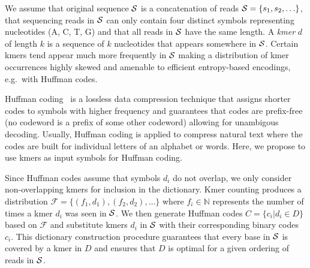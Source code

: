 \documentclass[12pt]{cmuthesis}
\makeatletter
\newcommand{\eg}{e.g.\@}
\makeatother
\begin{document}
We assume that original sequence $\mathcal{S}$ is a concatenation of reads $\mathcal{S} = \{s_1, s_2, \ldots \}$, that sequencing reads in $\mathcal{S}$ can only contain four distinct symbols representing nucleotides (A, C, T, G) and that all reads in $\mathcal{S}$ have the same length. A \textit{kmer} $d$ of length $k$ is a sequence of $k$ nucleotides that appears somewhere in $\mathcal{S}$. 
Certain kmers tend appear much more frequently in $\mathcal{S}$ making a distribution of kmer occurrences highly skewed and amenable to efficient entropy-based encodings, \eg~with Huffman codes.

Huffman coding~\cite{Huffman1952} is a lossless data compression technique that assigns shorter codes to symbols with higher frequency and guarantees that codes are prefix-free (no codeword is a prefix of some other codeword) allowing for unambigous decoding. 
Usually, Huffman coding is applied to compress natural text where the codes are built for individual letters of an alphabet or words. Here, we propose to use kmers as input symbols for Huffman coding.

Since Huffman codes assume that symbols $d_i$ do not overlap, we only consider non-overlapping kmers for inclusion in the dictionary. Kmer counting produces a distribution $\mathcal{F} = \{(f_1, d_1), (f_2, d_2), \ldots \}$ where $f_i \in \mathbb{N}$ represents the number of times a kmer $d_i$ was seen in $\mathcal{S}$. We then generate Huffman codes $C = \{ c_i | d_i \in D \}$ based on $\mathcal{F}$ and substitute kmers $d_i$ in $\mathcal{S}$ with their corresponding binary codes $c_i$. This dictionary construction procedure guarantees that every base in $\mathcal{S}$ is covered by a kmer in $D$ and ensures that $D$ is optimal for a given ordering of reads in $\mathcal{S}$.



\end{document}
